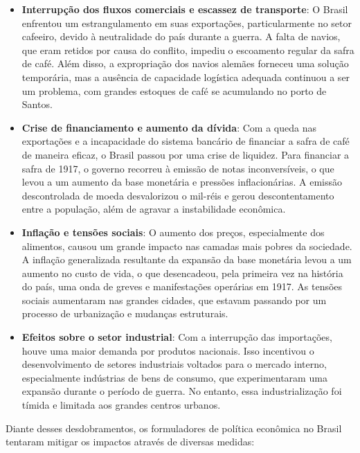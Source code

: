 \documentclass[a4paper,12pt]{article}[abntex2]
\begin{document}
\begin{itemize}
    \item \textbf{Interrupção dos fluxos comerciais e escassez de transporte}: O Brasil enfrentou um estrangulamento em suas exportações, particularmente no setor cafeeiro, devido à neutralidade do país durante a guerra. A falta de navios, que eram retidos por causa do conflito, impediu o escoamento regular da safra de café. Além disso, a expropriação dos navios alemães forneceu uma solução temporária, mas a ausência de capacidade logística adequada continuou a ser um problema, com grandes estoques de café se acumulando no porto de Santos.
    
    \item \textbf{Crise de financiamento e aumento da dívida}: Com a queda nas exportações e a incapacidade do sistema bancário de financiar a safra de café de maneira eficaz, o Brasil passou por uma crise de liquidez. Para financiar a safra de 1917, o governo recorreu à emissão de notas inconversíveis, o que levou a um aumento da base monetária e pressões inflacionárias. A emissão descontrolada de moeda desvalorizou o mil-réis e gerou descontentamento entre a população, além de agravar a instabilidade econômica.
    
    \item \textbf{Inflação e tensões sociais}: O aumento dos preços, especialmente dos alimentos, causou um grande impacto nas camadas mais pobres da sociedade. A inflação generalizada resultante da expansão da base monetária levou a um aumento no custo de vida, o que desencadeou, pela primeira vez na história do país, uma onda de greves e manifestações operárias em 1917. As tensões sociais aumentaram nas grandes cidades, que estavam passando por um processo de urbanização e mudanças estruturais.
    
    \item \textbf{Efeitos sobre o setor industrial}: Com a interrupção das importações, houve uma maior demanda por produtos nacionais. Isso incentivou o desenvolvimento de setores industriais voltados para o mercado interno, especialmente indústrias de bens de consumo, que experimentaram uma expansão durante o período de guerra. No entanto, essa industrialização foi tímida e limitada aos grandes centros urbanos.
\end{itemize}

\noindent Diante desses desdobramentos, os formuladores de política econômica no Brasil tentaram mitigar os impactos através de diversas medidas:
\end{document}
